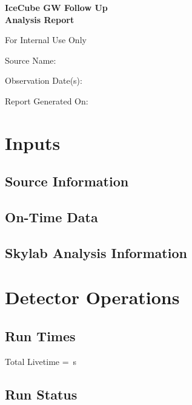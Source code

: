 \documentclass[titlepage]{article}
\begin{document}
\begin{titlepage}
  \centering
  \vspace{4cm}
  {\huge\bfseries IceCube GW Follow Up \\ Analysis Report\par}
  \vspace{1cm}
  {\LARGE For Internal Use Only\par}
  \vfill
  {\Large Source Name: \\ \itshape\sourcename\par}
  \vspace{0.5cm}
  {\Large Observation Date(s):\\ \obsdate \par}
  \vfill
  \vspace{1cm}
  {\Large Report Generated On:\\ \reportdate \par}
\end{titlepage}

\centering
\section{Inputs}
\subsection{Source Information}
\sourcetable
\subsection{On-Time Data}
\ontimetable
\subsection{Skylab Analysis Information}
\skylabtable 

\pagebreak
\centering
\section{Detector Operations}

\subsection{Run Times}
\runtimetable

Total Livetime = \livetime\,s

\centering
\subsection{Run Status}
\runstatustable
\end{document}
